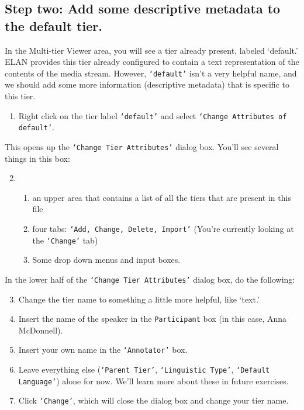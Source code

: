\documentclass[letterpaper,12pt]{article}
\begin{document}
\subsection*{Step two: Add some descriptive metadata to the default tier.}
In the Multi-tier Viewer area, you will see a tier already present, labeled `default.' ELAN provides this tier already configured to contain a text representation of the contents of the media stream. However, \texttt{`default'} isn't a very helpful name, and we should add some more information (descriptive metadata) that is specific to this tier.\\
\newpage
\begin{enumerate}
\item Right click on the tier label \texttt{`default'} and select \texttt{`Change Attributes of \textit{default}'}.
\end{enumerate}
This opens up the \texttt{`Change Tier Attributes'} dialog box. You'll see several things in this box:
\begin{enumerate}
\setcounter{enumi}{1}
\item[]
\begin{enumerate}
\item an upper area that contains a list of all the tiers that are present in this file
\item four tabs: \texttt{`Add, Change, Delete, Import'} (You're currently looking at the \texttt{`Change'} tab)
\item Some drop down menus and input boxes.
\end{enumerate}
\end{enumerate}
In the lower half of the \texttt{`Change Tier Attributes'} dialog box, do the following:
\begin{enumerate}
\setcounter{enumi}{2}
\item Change the tier name to something a little more helpful, like `text.'
\item Insert the name of the speaker in the \texttt{Participant} box (in this case, Anna McDonnell).
\item Insert your own name in the \texttt{`Annotator'} box.
\item Leave everything else (\texttt{`Parent Tier'}, \texttt{`Linguistic Type'}, \texttt{`Default Language'}) alone for now. We'll learn more about these in future exercises.
\item Click \texttt{`Change'}, which will close the dialog box and change your tier name.
\end{enumerate}
\end{document}

